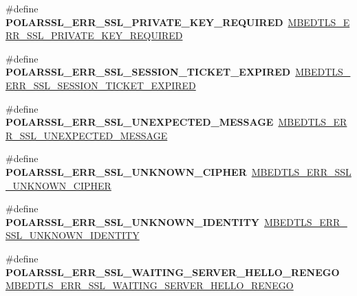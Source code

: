 \begin{DoxyCompactItemize}
\item 
\mbox{\label{compat-1_83_8h_a68feacf7e93dc9d0128e3888ae4a4858}} 
\#define {\bfseries P\+O\+L\+A\+R\+S\+S\+L\+\_\+\+E\+R\+R\+\_\+\+S\+S\+L\+\_\+\+P\+R\+I\+V\+A\+T\+E\+\_\+\+K\+E\+Y\+\_\+\+R\+E\+Q\+U\+I\+R\+ED}~\mbox{\hyperlink{ssl_8h_a4c40a91dc331782b9aaa82812fc38eb4}{M\+B\+E\+D\+T\+L\+S\+\_\+\+E\+R\+R\+\_\+\+S\+S\+L\+\_\+\+P\+R\+I\+V\+A\+T\+E\+\_\+\+K\+E\+Y\+\_\+\+R\+E\+Q\+U\+I\+R\+ED}}
\item 
\mbox{\label{compat-1_83_8h_afd2d6575711d0c484fbc9da8dbca3532}} 
\#define {\bfseries P\+O\+L\+A\+R\+S\+S\+L\+\_\+\+E\+R\+R\+\_\+\+S\+S\+L\+\_\+\+S\+E\+S\+S\+I\+O\+N\+\_\+\+T\+I\+C\+K\+E\+T\+\_\+\+E\+X\+P\+I\+R\+ED}~\mbox{\hyperlink{ssl_8h_a8b1558e0b749f8b5f856d73d8b9869e9}{M\+B\+E\+D\+T\+L\+S\+\_\+\+E\+R\+R\+\_\+\+S\+S\+L\+\_\+\+S\+E\+S\+S\+I\+O\+N\+\_\+\+T\+I\+C\+K\+E\+T\+\_\+\+E\+X\+P\+I\+R\+ED}}
\item 
\mbox{\label{compat-1_83_8h_ae047b69d2893d835285016db717d4f56}} 
\#define {\bfseries P\+O\+L\+A\+R\+S\+S\+L\+\_\+\+E\+R\+R\+\_\+\+S\+S\+L\+\_\+\+U\+N\+E\+X\+P\+E\+C\+T\+E\+D\+\_\+\+M\+E\+S\+S\+A\+GE}~\mbox{\hyperlink{ssl_8h_ada7521232ac79a0cc64e8f5325fc7574}{M\+B\+E\+D\+T\+L\+S\+\_\+\+E\+R\+R\+\_\+\+S\+S\+L\+\_\+\+U\+N\+E\+X\+P\+E\+C\+T\+E\+D\+\_\+\+M\+E\+S\+S\+A\+GE}}
\item 
\mbox{\label{compat-1_83_8h_aa719a34cc90e8d15dbface25b41e88db}} 
\#define {\bfseries P\+O\+L\+A\+R\+S\+S\+L\+\_\+\+E\+R\+R\+\_\+\+S\+S\+L\+\_\+\+U\+N\+K\+N\+O\+W\+N\+\_\+\+C\+I\+P\+H\+ER}~\mbox{\hyperlink{ssl_8h_ac9df50cb6b7d5f0d3507a6bf8405adfe}{M\+B\+E\+D\+T\+L\+S\+\_\+\+E\+R\+R\+\_\+\+S\+S\+L\+\_\+\+U\+N\+K\+N\+O\+W\+N\+\_\+\+C\+I\+P\+H\+ER}}
\item 
\mbox{\label{compat-1_83_8h_a5a52f3f1ee73e9c928003800909fef95}} 
\#define {\bfseries P\+O\+L\+A\+R\+S\+S\+L\+\_\+\+E\+R\+R\+\_\+\+S\+S\+L\+\_\+\+U\+N\+K\+N\+O\+W\+N\+\_\+\+I\+D\+E\+N\+T\+I\+TY}~\mbox{\hyperlink{ssl_8h_adf3630ee46adcea979db9519225d0519}{M\+B\+E\+D\+T\+L\+S\+\_\+\+E\+R\+R\+\_\+\+S\+S\+L\+\_\+\+U\+N\+K\+N\+O\+W\+N\+\_\+\+I\+D\+E\+N\+T\+I\+TY}}
\item 
\mbox{\label{compat-1_83_8h_a93189c5d341b4b5cc3718f53ae7d646e}} 
\#define {\bfseries P\+O\+L\+A\+R\+S\+S\+L\+\_\+\+E\+R\+R\+\_\+\+S\+S\+L\+\_\+\+W\+A\+I\+T\+I\+N\+G\+\_\+\+S\+E\+R\+V\+E\+R\+\_\+\+H\+E\+L\+L\+O\+\_\+\+R\+E\+N\+E\+GO}~\mbox{\hyperlink{ssl_8h_adbadeb512c769067a5dbe1de97a85ad5}{M\+B\+E\+D\+T\+L\+S\+\_\+\+E\+R\+R\+\_\+\+S\+S\+L\+\_\+\+W\+A\+I\+T\+I\+N\+G\+\_\+\+S\+E\+R\+V\+E\+R\+\_\+\+H\+E\+L\+L\+O\+\_\+\+R\+E\+N\+E\+GO}}

\end{DoxyCompactItemize}
